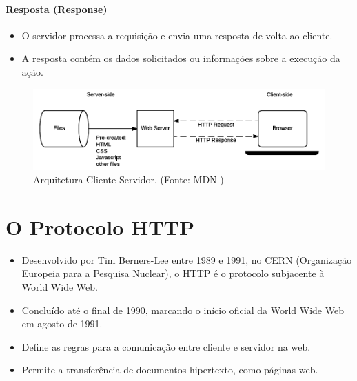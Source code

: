 \documentclass{article}
\begin{document}
\paragraph{Resposta (Response)}

\begin{itemize}
    \item O servidor processa a requisição e envia uma resposta de volta ao cliente.
    \item A resposta contém os dados solicitados ou informações sobre a execução da ação.
\end{itemize}

\begin{figure}[H]
    \centering
    \includegraphics[width=\textwidth]{./assets/5859.png}
    \caption{Arquitetura Cliente-Servidor. (Fonte: MDN \cite{mdn-client-server})}
\end{figure}

\section{O Protocolo HTTP}

\begin{itemize}
    \item Desenvolvido por Tim Berners-Lee entre 1989 e 1991, no CERN (Organização
          Europeia para a Pesquisa Nuclear), o HTTP é o protocolo subjacente à World Wide
          Web.
    \item Concluído até o final de 1990, marcando o início oficial da World Wide Web em
          agosto de 1991.
    \item Define as regras para a comunicação entre cliente e servidor na web.
    \item Permite a transferência de documentos hipertexto, como páginas web.
\end{itemize}
\end{document}
